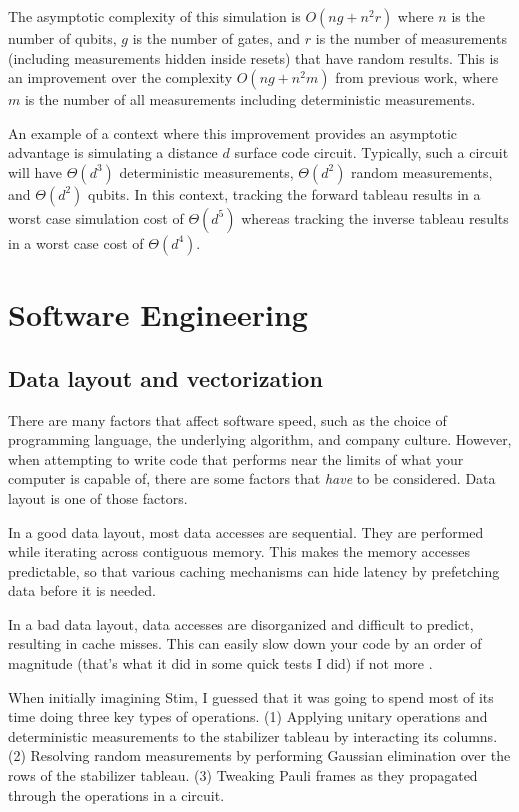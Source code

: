 \documentclass[onecolumn,unpublished]{quantumarticle}
\theoremstyle{definition}
\theoremstyle{definition}
\theoremstyle{definition}
\begin{document}
The asymptotic complexity of this simulation is $O(ng + n^2r)$ where $n$ is the number of qubits, $g$ is the number of gates, and $r$ is the number of measurements (including measurements hidden inside resets) that have random results.
This is an improvement over the complexity $O(ng + n^2m)$ from previous work, where $m$ is the number of all measurements including deterministic measurements.

An example of a context where this improvement provides an asymptotic advantage is simulating a distance $d$ surface code circuit.
Typically, such a circuit will have $\Theta(d^3)$ deterministic measurements, $\Theta(d^2)$ random measurements, and $\Theta(d^2)$ qubits.
In this context, tracking the forward tableau results in a worst case simulation cost of $\Theta(d^5)$ whereas tracking the inverse tableau results in a worst case cost of $\Theta(d^4)$.

\section{Software Engineering}
\label{sec:engineering}

\subsection{Data layout and vectorization}

There are many factors that affect software speed, such as the choice of programming language, the underlying algorithm, and company culture.
However, when attempting to write code that performs near the limits of what your computer is capable of, there are some factors that {\em have} to be considered.
Data layout is one of those factors.

In a good data layout, most data accesses are sequential.
They are performed while iterating across contiguous memory.
This makes the memory accesses predictable, so that various caching mechanisms can hide latency by prefetching data before it is needed.

In a bad data layout, data accesses are disorganized and difficult to predict, resulting in cache misses.
This can easily slow down your code by an order of magnitude (that's what it did in some quick tests I did) if not more \cite{norviglatency}.

When initially imagining Stim, I guessed that it was going to spend most of its time doing three key types of operations.
(1) Applying unitary operations and deterministic measurements to the stabilizer tableau by interacting its columns.
(2) Resolving random measurements by performing Gaussian elimination over the rows of the stabilizer tableau.
(3) Tweaking Pauli frames as they propagated through the operations in a circuit.
\end{document}
